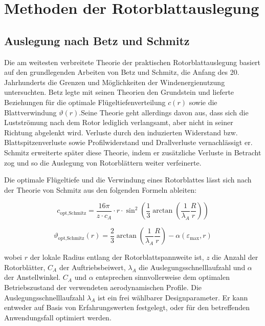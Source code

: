\section{Methoden der Rotorblattauslegung}
\subsection{Auslegung nach Betz und Schmitz}
\label{subsec:betz-schmitz-auslegung}
Die am weitesten verbreitete Theorie der praktischen Rotorblattauslegung basiert auf den grundlegenden Arbeiten von Betz und Schmitz, die Anfang des 20. Jahrhunderts die Grenzen und Möglichkeiten der Windenergienutzung untersuchten. Betz legte mit seinen Theorien den Grundstein und lieferte Beziehungen für die optimale Flügeltiefenverteilung \( c(r) \) sowie die Blattverwindung \( \vartheta(r) \).Seine Theorie geht allerdings davon aus, dass sich die Lustströmung nach dem Rotor lediglich verlangsamt, aber nicht in seiner Richtung abgelenkt wird. Verluste durch den induzierten Widerstand bzw. Blattspitzenverluste sowie Profilwiderstand und Drallverluste vernachlässigt er. Schmitz erweiterte später diese Theorie, indem er zusätzliche Verluste in Betracht zog und so die Auslegung von Rotorblättern weiter verfeinerte.

Die optimale Flügeltiefe  und die Verwindung  eines Rotorblattes lässt sich nach der Theorie von Schmitz aus den folgenden Formeln ableiten: 
\newline

\begin{equation}
c_{\text{opt,Schmitz}} = \frac{16 \pi}{z \cdot c_A} \cdot r \cdot \sin^2 \left( \frac{1}{3} \arctan \left( \frac{1}{\lambda_A }\frac{R}{r} \right) \right)
\end{equation}
\newline

\begin{equation}
\vartheta_{\text{opt,Schmitz}}(r) = \frac{2}{3} \arctan \left( \frac{1}{\lambda_A} \frac{R}{r} \right) - \alpha \left( \varepsilon_{\text{max}}, r \right)
\end{equation}
\newline

wobei \( r \) der lokale Radius entlang der Rotorblattspannweite ist, \( z \) die Anzahl der Rotorblätter, \( C_A \) der Auftriebsbeiwert, \( \lambda_A \) die Auslegungsschnelllaufzahl und \( \alpha \) der Anstellwinkel. \( C_A \) und \( \alpha \) entsprechen sinnvollerweise dem optimalen Betriebszustand der verwendeten aerodynamischen Profile. Die Auslegungsschnelllaufzahl \( \lambda_A \) ist ein frei wählbarer Designparameter. Er kann entweder auf Basis von Erfahrungswerten festgelegt, oder für den betreffenden Anwendungsfall optimiert werden.

